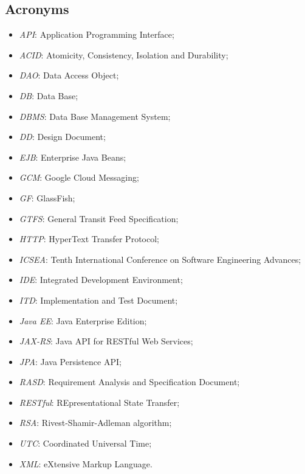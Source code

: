 \subsection{Acronyms}
	\begin{itemize}
	\item \textit{API}: Application Programming Interface;
	\item \textit{ACID}: Atomicity, Consistency, Isolation and Durability;
	\item \textit{DAO}: Data Access Object;
	\item \textit{DB}: Data Base;
	\item \textit{DBMS}: Data Base Management System;
	\item \textit{DD}: Design Document;
	\item \textit{EJB}: Enterprise Java Beans;
	\item \textit{GCM}: Google Cloud Messaging;
	\item \textit{GF}: GlassFish;
	\item \textit{GTFS}: General Transit Feed Specification;
	\item \textit{HTTP}: HyperText Transfer Protocol;
	\item \textit{ICSEA}: Tenth International Conference on Software Engineering Advances;
	\item \textit{IDE}: Integrated Development Environment;
	\item \textit{ITD}: Implementation and Test Document;
	\item \textit{Java EE}: Java Enterprise Edition;
	\item \textit{JAX-RS}: Java API for RESTful Web Services;
	\item \textit{JPA}: Java Persistence API;
	\item \textit{RASD}: Requirement Analysis and Specification Document;
	\item \textit{RESTful}: REpresentational State Transfer;
	\item \textit{RSA}: Rivest-Shamir-Adleman algorithm;
	\item \textit{UTC}: Coordinated Universal Time;
	\item \textit{XML}: eXtensive Markup Language.
	\end{itemize}